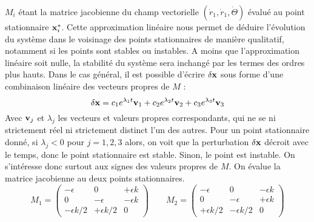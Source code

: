 %
$M_i$ étant la matrice jacobienne du champ vectorielle $(\dot{r}_1, \dot{r}_1, \dot{\Theta})$ évalué au point stationnaire $\vb{x}^*_i$.
%
Cette approximation linéaire nous permet de déduire l'évolution du système dans le voisinage des points stationnaires de manière qualitatif, notamment si les points sont stables ou instables. 
A moins que l'approximation linéaire soit nulle, la stabilité du système sera inchangé par les termes des ordres plus hauts.
%
%
%
Dans le cas général, il est possible d'écrire $\delta\vb{x}$ sous forme d'une combinaison linéaire des vecteurs propres de $M$ :
%
\[ \delta\vb{x} = c_1 e^{\lambda_1 t}\vb{v}_1 + c_2 e^{\lambda_2 t}\vb{v}_2 + c_3 e^{\lambda_3 t}\vb{v}_3\]
%
Avec $\vb{v}_j$ et $\lambda_j$ les vecteurs et valeurs propres correspondants, qui ne se ni strictement réel ni strictement distinct l'un des autres.
%
Pour un point stationnaire donné, si $\lambda_j < 0$ pour $j = 1, 2, 3$ alors, on voit que la perturbation $\delta\vb{x}$ décroit avec le temps, donc le point stationnaire est stable. Sinon, le point est instable.
%
On s'intéresse donc surtout aux signes des valeurs propres de $M$.
%
On évalue la matrice jacobienne au deux points stationnaires.
%
\begin{equation}
    M_1 = \begin{pmatrix}
             -\epsilon & 0 & +\epsilon k \\
             0 & -\epsilon & -\epsilon k \\
            -\epsilon k/2 & +\epsilon k/2 & 0
         \end{pmatrix}
    \qquad
    M_2 = \begin{pmatrix}
             -\epsilon & 0 & -\epsilon k \\
             0 & -\epsilon & +\epsilon k \\
             +\epsilon k/2 & -\epsilon k/2 & 0
         \end{pmatrix}
\end{equation}
%
